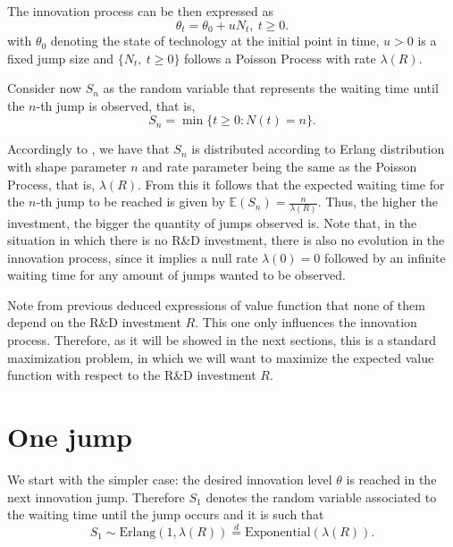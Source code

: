 The innovation process can be then expressed as
$$\theta_t=\theta_0+uN_t, \ t\geq 0.$$ 
with $\theta_0$ denoting the state of technology at the initial point in time, $u>0$ is a fixed jump size and $\{ N_t, \ t \geq 0 \}$ follows a Poisson Process with rate $\lambda(R)$. 

Consider now $S_n$ as the random variable that represents the waiting time until the $n$-th jump is observed, that is,
$$S_n=\min \{t\geq 0: N(t)=n \}.$$

Accordingly to \cite{ross}, we have that $S_n$ is distributed according to Erlang distribution with shape parameter $n$ and rate parameter being the same as the Poisson Process, that is, $\lambda(R)$. From this it follows that the expected waiting time for the $n$-th jump to be reached is given by $\mathds{E}(S_n)=\frac{n}{\lambda(R)}.$ Thus, the higher the investment, the bigger the quantity of jumps observed is. Note that, in the situation in which there is no R\&D investment, there is also no evolution in the innovation process, since it implies a null rate $\lambda(0)=0$ followed by an infinite waiting time for any amount of jumps wanted to be observed.

Note from previous deduced expressions of value function that none of them depend on the R\&D investment $R$. This one only influences the innovation process. Therefore, as it will be showed in the next sections, this is a standard maximization problem, in which we will want to maximize the expected value function with respect to the R\&D investment $R$.

\section{One jump}
\label{section:max_1jump}

We start with the simpler case: the desired innovation level $\theta$ is reached in the next innovation jump.
Therefore $S_1$ denotes the random variable associated to the waiting time until the jump occurs and it is such that
$$S_1 \sim \text{Erlang}(1,\lambda(R)) \overset{d}{=} \text{Exponential}(\lambda(R)).$$

